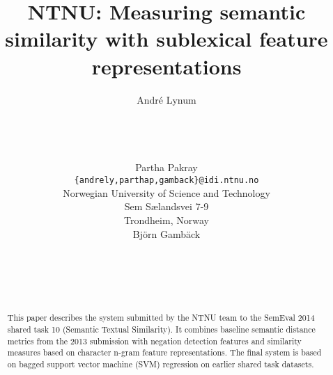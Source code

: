 \documentclass[11pt]{article}
\title{NTNU: Measuring semantic similarity with sublexical feature representations}
\author{Andr\'{e} Lynum \\
  \\
  \\
  \\
  \\
  \And
  Partha Pakray \\
  {\tt \{andrely,parthap,gamback\}@idi.ntnu.no} \\
  Norwegian University of Science and Technology \\
  Sem S{\ae}landsvei 7-9 \\
  Trondheim, Norway \\
  \And
  Bj\"{o}rn Gamb\"{a}ck \\
  \\
  \\
  \\
  \\
}
\date{}
\begin{document}
\maketitle
\begin{abstract}
  This paper describes the system submitted by the NTNU team to the SemEval 2014 shared task 10 (Semantic Textual Similarity). It combines baseline semantic distance metrics from the 2013 submission with negation detection features and similarity measures based on character n-gram feature representations. The final system is based on bagged support vector machine (SVM) regression on earlier shared task datasets.
\end{abstract}













\end{document}

